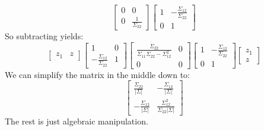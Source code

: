 \documentclass{article}
\begin{document}
\begin{itemize}
\begin{answer}
\begin{equation*}
\begin{bmatrix}
                            0 & 0                     \\
                            0                                                            & \frac{1}{\Sigma_{22}}   
                        \end{bmatrix}\begin{bmatrix}
                            1 & -\frac{\Sigma_{12}}{\Sigma_{22}} \\
                            0 & 1                                  
                        \end{bmatrix}
                    \end{equation*}
                So subtracting yields:
                    \begin{equation*}
                        \begin{bmatrix}
                            z_{1} & z   
                        \end{bmatrix}\begin{bmatrix}
                            1                                & 0 \\
                            -\frac{\Sigma_{12}}{\Sigma_{22}} & 1   
                        \end{bmatrix}\begin{bmatrix}
                            \frac{\Sigma_{22}}{\Sigma_{11}\Sigma_{22} - \Sigma_{12}^{2}} & 0 \\
                            0                                                            & 0   
                        \end{bmatrix}\begin{bmatrix}
                            1 & -\frac{\Sigma_{12}}{\Sigma_{22}} \\
                            0 & 1                                  
                        \end{bmatrix}\begin{bmatrix}
                            z_{1} \\
                            z       
                        \end{bmatrix}
                    \end{equation*}
                We can simplify the matrix in the middle down to:
                    \begin{equation*}
                        \begin{bmatrix}
                            \frac{\Sigma_{22}}{\lvert \Sigma \rvert}                                 & -\frac{\Sigma_{12}}{\lvert \Sigma \rvert}        \\
                            -\frac{\Sigma_{12}}{\lvert \Sigma \rvert} & \frac{\Sigma_{12}^{2}}{\Sigma_{22}\lvert \Sigma \rvert}   
                        \end{bmatrix}
                    \end{equation*}
                The rest is just algebraic manipulation.
            \end{answer}
    \end{itemize}
\end{document}
